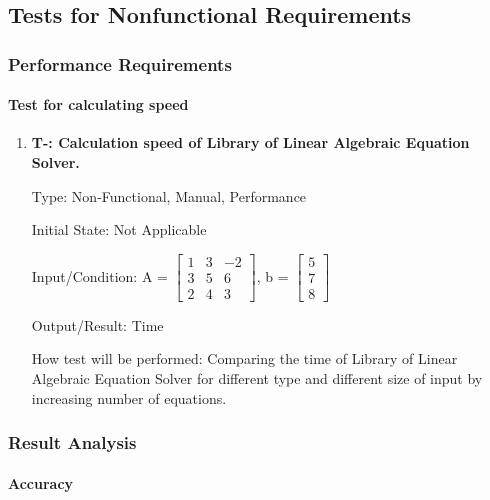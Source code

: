 \documentclass[12pt, titlepage]{article}
\newcounter{tnum}
\begin{document}
\subsection{Tests for Nonfunctional Requirements}

\subsubsection{Performance Requirements}
		
\paragraph{Test for calculating speed}

\begin{enumerate}

\item{\textbf{T-\thetnum \label{t-speed}: Calculation speed
of Library of Linear Algebraic Equation Solver.}}


Type: Non-Functional, Manual, Performance
					
Initial State: Not Applicable
					
Input/Condition: A = $\begin{bmatrix} 
1 & 3 & -2 \\
3 & 5 & 6\\
2 & 4 & 3
\end{bmatrix}$, b = $\begin{bmatrix} 
5\\
7\\
8 
\end{bmatrix}$
					
Output/Result: Time
					
How test will be performed: Comparing the time of Library of Linear Algebraic
Equation Solver for different type and different size of input by increasing
number of equations.
					


\end{enumerate}

\subsubsection{Result Analysis}

\paragraph{Accuracy}
\end{document}

